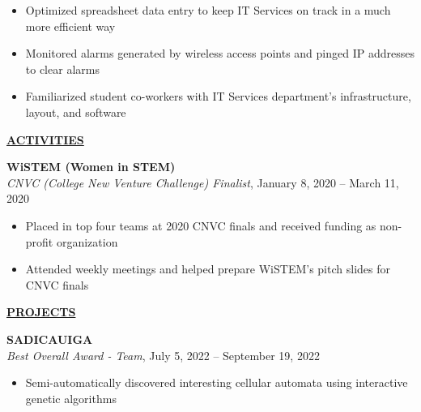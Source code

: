 \documentclass[
]{article}
\providecommand{\tightlist}{%
  \setlength{\itemsep}{0pt}\setlength{\parskip}{0pt}}
\begin{document}
\begin{itemize}
\tightlist
\item
  Optimized spreadsheet data entry to keep IT Services on track in a
  much more efficient way
\end{itemize}

\begin{itemize}
\item
  Monitored alarms generated by wireless access points and pinged IP
  addresses to clear alarms
\item
  Familiarized student co-workers with IT Services department's
  infrastructure, layout, and software
\end{itemize}



\textbf{\underline{ACTIVITIES}}

\textbf{WiSTEM (Women in STEM)}\\
\emph{CNVC (College New Venture Challenge) Finalist}, January 8, 2020 --
March 11, 2020

\begin{itemize}
\tightlist
\item
  Placed in top four teams at 2020 CNVC finals and received funding as
  non-profit organization
\end{itemize}

\begin{itemize}
\tightlist
\item
  Attended weekly meetings and helped prepare WiSTEM's pitch slides for
  CNVC finals
\end{itemize}

\textbf{\underline{PROJECTS}}


\textbf{SADICAUIGA} \\
\emph{Best Overall Award - Team}, July 5, 2022 -- September 19, 2022
\begin{itemize}
\tightlist
\item
Semi-automatically discovered interesting cellular automata using interactive genetic algorithms
\end{itemize}
\end{document}
